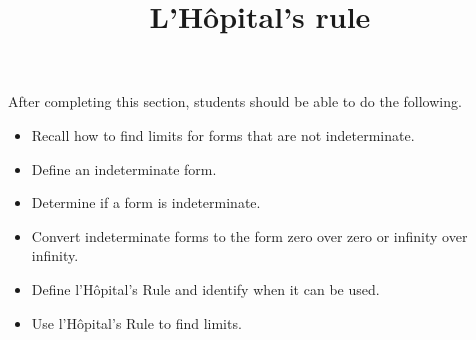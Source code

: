 \documentclass{ximera}
\title{L'H\^{o}pital's rule}
\begin{document}
\begin{abstract}
\end{abstract}

\maketitle

\begin{sectionOutcomes}

After completing this section, students should be able to do the following.

\begin{itemize}
	\item Recall how to find limits for forms that are not indeterminate.
	\item Define an indeterminate form.
	\item Determine if a form is indeterminate.
	\item Convert indeterminate forms to the form zero over zero
          or infinity over infinity.
	\item Define l'H\^{o}pital's Rule and identify when it can be used.
	\item Use l'H\^{o}pital's Rule to find limits.
\end{itemize}

\end{sectionOutcomes}
\end{document}
